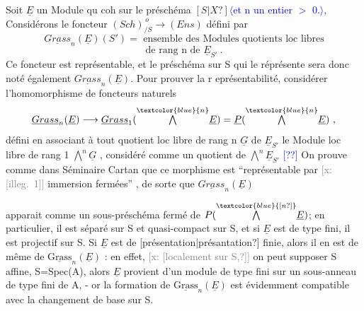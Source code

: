 \documentclass[11pt]{article}
\newcommand{\scanpage}[1]{\par\bigskip\noindent{\small\sffamily[scan #1]}\par}
\newcommand{\mspage}[1]{{\small\sffamily[p.\,#1]}}
\newcommand{\hand}[1]{\textcolor{blue}{#1}}
\newcommand{\inserted}[2][]{\textcolor{blue}{$\langle$#2$\rangle$}}
\newcommand{\xout}[1]{\textcolor{gray}{[\textsf{x:} #1]}}
\newcommand{\unsure}[1]{[#1?]}
\newcommand{\illegible}[1]{[\textsf{illeg.\ #1}]}
\begin{document}
Soit  $\underline{E}$  un Module qu coh  sur le préschéma $\unsure{S|X}$\inserted[typed]{et n un entier \hand{$>$} 0.}\hand{,} Considérons le
foncteur \qquad $(Sch)_{/S}^{\,o} \longrightarrow (Ens)$  défini par
\[ \underline{Grass}_n(\underline{E})(S') = \text{ ensemble des Modules quotients loc libres} \]
\[ \text{de rang  n  de } \underline{E}_{S'} \ . \]
Ce foncteur est représentable, et le préschéma sur S qui le réprésente
sera donc noté également $\underline{Grass}_n(\underline{E})$.  Pour prouver la r eprésentabilité,
considérer l'homomorphisme de foncteurs naturels
\[ \underline{Grass}_n(\underline{E}) \longrightarrow \underline{Grass}_1( \overset{\hand{n}}{\textstyle\bigwedge} \underline{E} ) = \underline{P} ( \overset{\hand{n}}{\textstyle\bigwedge} \underline{E}) \ , \]
défini en associant à  tout  quotient loc libre  de rang n  $\underline{G}$  de $\underline{E}_{S'}$
le Module  loc libre de rang 1 \quad $\overset{n}{\textstyle\bigwedge} \underline{G}$ , considéré comme un quotient
de  $\overset{n}{\textstyle\bigwedge} \underline{E}_{S'}$ \hand{\unsure{?}}  On prouve comme dans  Séminaire Cartan que  ce morphisme
est  ``représentable par \xout{\illegible{1}} immersion fermées'' , de sorte que $\underline{Grass}_n(\underline{E})$

\mspage{62}

\clearpage
\scanpage{25/63}
\mspage{58}

apparait comme un sous-préschéma fermé de $P(\overset{\hand{\unsure{n}}}{\bigwedge}\underline{E})$; en particulier, il
est séparé sur S et quasi-compact sur S, et  si $\underline{E}$  est de type fini,
il est projectif sur S. Si $\underline{E}$ est de \unsure{présentation|présantation} finie, alors
il en est de même de $\underline{\text{Grass}}_n(\underline{E})$ : en effet, \xout{\unsure{localement sur S,}} on peut
supposer S affine, S=Spec(A), alors $\underline{E}$ provient d'un module de type fini
sur un sous-anneau de type fini de A, -  or la formation de $\underline{\text{Grass}}_n(\underline{E})$
est évidemment compatible avec la changement de base sur S.
\end{document}
